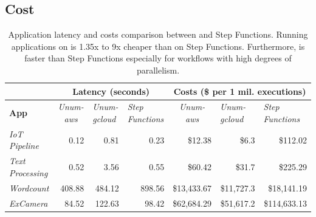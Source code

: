 \subsection{Cost}

\begin{table}[t]
  \centering
  \begin{tabular}{|l|rrr|rrr|}
\hline
                         & \multicolumn{3}{c|}{\textbf{Latency (seconds)}}                    & \multicolumn{3}{c|}{\textbf{Costs (\$ per 1 mil. executions)}} \\ \hline
\textbf{App} &
  \multicolumn{1}{c|}{\textit{Unum-aws}} &
  \multicolumn{1}{l|}{\textit{Unum-gcloud}} &
  \multicolumn{1}{l|}{\textit{Step Functions}} &
  \multicolumn{1}{c|}{\textit{Unum-aws}} &
  \multicolumn{1}{l|}{\textit{Unum-gcloud}} &
  \multicolumn{1}{l|}{\textit{Step Functions}} \\ \hline
\textit{IoT Pipeline}    & \multicolumn{1}{r|}{0.12}   & \multicolumn{1}{r|}{0.81}   & 0.23   & \multicolumn{1}{r|}{\$12.38}             & \multicolumn{1}{r|}{\$6.3}         & \$112.02            \\ \hline
\textit{Text Processing} & \multicolumn{1}{r|}{0.52}   & \multicolumn{1}{r|}{3.56}   & 0.55   & \multicolumn{1}{r|}{\$60.42}             & \multicolumn{1}{r|}{\$31.7}        & \$225.29            \\ \hline
\textit{Wordcount}       & \multicolumn{1}{r|}{408.88} & \multicolumn{1}{r|}{484.12} & 898.56 & \multicolumn{1}{r|}{\$13,433.67}         & \multicolumn{1}{r|}{\$11,727.3}    & \$18,141.19         \\ \hline
\textit{ExCamera}        & \multicolumn{1}{r|}{84.52}  & \multicolumn{1}{r|}{122.63} & 98.42  & \multicolumn{1}{r|}{\$62,684.29}         & \multicolumn{1}{r|}{\$51,617.2}    & \$114,633.13        \\ \hline
\end{tabular}
  \caption{Application latency and costs comparison between \name{} and Step
    Functions. Running applications on \name{} is 1.35x to 9x cheaper than
    on Step Functions. Furthermore, \name{} is faster than Step Functions
    especially for workflows with high degrees of parallelism.}
  \label{table:macro}
\end{table}


